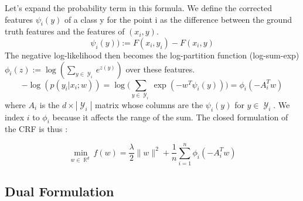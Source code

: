 \documentclass{article}
\DeclareMathOperator{\R}{\mathbb{R}}
\DeclareMathOperator{\1}{\mathbb{1}}
\DeclareMathOperator{\Y}{\mathcal{Y}}
\begin{document}
Let's expand the probability term in this formula.
We define the corrected features $\psi_i(y)$ of a class y for the point i as the difference between the ground truth features and the features of $(x_i, y)$.
\begin{equation}
	\psi_i(y)) := F(x_i, y_i) - F(x_i, y)
\end{equation}
The negative log-likelihood then becomes the log-partition function (log-sum-exp) $\phi_i(z):=\log(\sum_{y\in \Y_i} e^{z(y)})$ over these features.
\begin{equation}
	- \log(p(y_i|x_i; w)) = \log \bigg ( \sum_{y \in \Y_i}  \exp(-w^T\psi_i(y)) \bigg ) = \phi_i(-A_i^Tw)	
\end{equation}
where $A_i$  is the $d\times |\Y_i|$ matrix whose columns are the $\psi_i(y)$ for $y \in \Y_i$.
We index $i$ to $\phi_i$ because it affects the range of the sum.
The closed formulation of the CRF is thus :

\begin{equation}
\min_{w\in\R^d} f(w) = \frac{\lambda}{2}\|w\|^2 + \frac{1}{n}   \sum_{i=1}^{n} \phi_i(-A_i^Tw)	
\end{equation}


\subsection{Dual Formulation}
\end{document}
